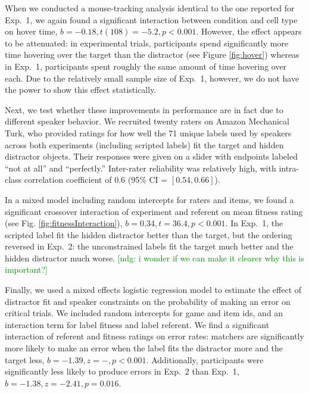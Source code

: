 \documentclass[10pt,letterpaper]{article}
\newcommand{\ndg}[1]{\textcolor{Green}{[ndg: #1]}}
\begin{document}
When we conducted a mouse-tracking analysis identical to the one reported for Exp.~1, we again found a significant interaction between condition and cell type on hover time, $b = -0.18, t(108) = -5.2, p < 0.001$. However, the effect appears to be attenuated: in experimental trials, participants spend significantly more time hovering over the target than the distractor (see Figure \ref{fig:hover}) whereas in Exp.~1, participants spent roughly the same amount of time hovering over each. Due to the relatively small sample size of Exp.~1, however, we do not have the power to show this effect statistically.

Next, we test whether these improvements in performance are in fact due to different speaker behavior. We recruited twenty raters on Amazon Mechanical Turk, who provided ratings for how well the 71 unique labels used by speakers across both experiments (including scripted labels) fit the target and hidden distractor objects. Their responses were given on a slider with endpoints labeled ``not at all'' and ``perfectly.''  Inter-rater reliability was relatively high, with intra-class correlation coefficient of $0.6$ (95\% CI = $[0.54, 0.66]$).

In a mixed model including random intercepts for raters and items, we found a significant crossover interaction of experiment and referent on mean fitness rating (see Fig. \ref{fig:fitnessInteraction}), $b = 0.34, t = 36.4, p < 0.001$. In Exp.~1, the scripted label fit the hidden distractor better than the target, but the ordering reversed in Exp.~2: the unconstrained labels fit the target much better and the hidden distractor much worse.
\ndg{i wonder if we can make it clearer why this is important?}

Finally, we used a mixed effects logistic regression model to estimate the effect of distractor fit and speaker constraints on the probability of making an error on critical trials. We included random intercepts for game and item ids, and an interaction term for label fitness and label referent. We find a significant interaction of referent and fitness ratings on error rates: matchers are significantly more likely to make an error when the label fits the distractor more and the target less, $b =-1.39, z = -, p < 0.001$. Additionally, participants were significantly less likely to produce errors in Exp.~2 than Exp.~1, $b = -1.38, z = -2.41, p = 0.016$.
\end{document}
